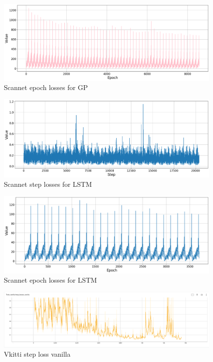 	\begin{figure}
		\centering
		\includegraphics[width=13cm]{images/scannet_gp_epoch_all.png}
		\caption{Scannet epoch losses for GP}
		\label{fig:android_result}
	\end{figure}

	\begin{figure}
		\centering
		\includegraphics[width=13cm]{images/scannet_step_lstm.png}
		\caption{Scannet step losses for LSTM}
		\label{fig:android_result}
	\end{figure}

	\begin{figure}
		\centering
		\includegraphics[width=13cm]{images/scannet_lstm_epoch_all.png}
		\caption{Scannet epoch losses for LSTM}
		\label{fig:android_result}
	\end{figure}

	\begin{figure}
		\centering
		\includegraphics[width=13cm]{images/vanilla_step_loss_vkitti.png}
		\caption{Vkitti step loss vanilla}
		\label{fig:android_result}
	\end{figure}

